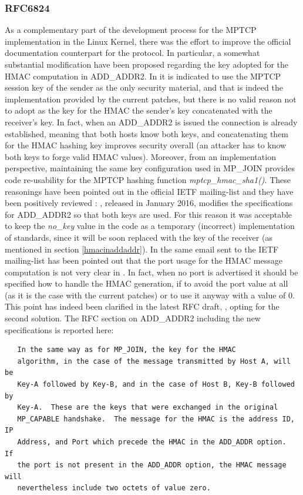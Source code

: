 \subsubsection{RFC6824}
As a complementary part of the development process for the MPTCP implementation in the Linux Kernel, there was the effort to improve the official documentation counterpart for the protocol. In particular, a somewhat substantial modification have been proposed regarding the key adopted for the HMAC computation in ADD\_ADDR2. In  it is indicated to use the MPTCP session key of the sender as the only security material, and that is indeed the implementation provided by the current patches, but there is no valid reason not to adopt as the key for the HMAC the sender's key concatenated with the receiver's key. In fact, when an ADD\_ADDR2 is issued the connection is already established, meaning that both hosts know both keys, and concatenating them for the HMAC hashing key improves security overall (an attacker has to know both keys to forge valid HMAC values). Moreover, from an implementation perspective, maintaining the same key configuration used in MP\_JOIN provides code re-usability for the MPTCP hashing function \textit{mptcp\_hmac\_sha1()}.
These reasonings have been pointed out in the official IETF mailing-list and they have been positively reviewed \cite{maillist}: , released in January 2016, modifies the specifications for ADD\_ADDR2 so that both keys are used. For this reason it was acceptable to keep the \textit{no\_key} value in the code as a temporary (incorrect) implementation of  standards, since it will be soon replaced with the key of the receiver (as mentioned in section \ref{hmacinaddaddr}). 
In the same email sent to the IETF mailing-list has been pointed out that the port usage for the HMAC message computation is not very clear in . In fact, when no port is advertised it should be specified how to handle the HMAC generation, if to avoid the port value at all (as it is the case with the current patches) or to use it anyway with a value of 0. This point has indeed been clarified in the latest RFC draft, , opting for the second solution. The RFC section on ADD\_ADDR2 including the new specifications is reported here:

\begin{verbatim}
   In the same way as for MP_JOIN, the key for the HMAC
   algorithm, in the case of the message transmitted by Host A, will be
   Key-A followed by Key-B, and in the case of Host B, Key-B followed by
   Key-A.  These are the keys that were exchanged in the original
   MP_CAPABLE handshake.  The message for the HMAC is the address ID, IP
   Address, and Port which precede the HMAC in the ADD_ADDR option.  If
   the port is not present in the ADD_ADDR option, the HMAC message will
   nevertheless include two octets of value zero.
\end{verbatim}

